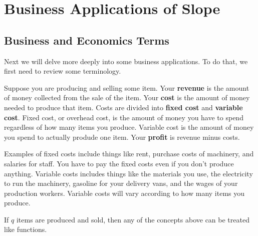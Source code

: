 \section{Business Applications of Slope}
\label{sec:basic-apps}

\subsection{Business and Economics Terms}
Next we will delve more deeply into some business applications. To do that, we first need to review some terminology.
\begin{definition}
Suppose you are producing and selling some item. Your {\bf revenue} is the amount of money collected from the sale of the item. Your {\bf cost} is the amount of money needed to produce that item. Costs are divided into {\bf fixed cost} and {\bf variable cost}. Fixed cost, or overhead cost, is the amount of money you have to spend regardless of how many items you produce. Variable cost is the amount of money you spend to actually produde one item. Your {\bf profit} is revenue minus costs.
\end{definition}

Examples of fixed costs include things like rent, purchase costs of machinery, and salaries for staff. You have to pay the fixed costs even if you don’t produce anything. Variable costs includes things like the materials you use, the electricity to run the machinery, gasoline for your delivery vans, and the wages of your production workers. Variable costs will vary according to how many items you produce.

If $q$ items are produced and sold, then any of the concepts above can be treated like functions.

